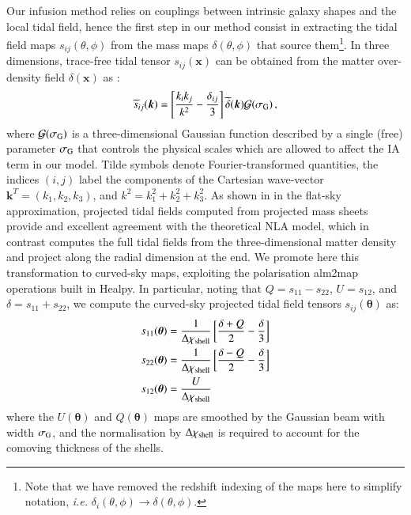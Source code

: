 Our infusion method relies on couplings between intrinsic galaxy shapes and the local tidal field, hence the first step in our method consist in extracting the tidal field maps $s_{ij}(\theta,\phi)$ from the mass maps $\delta(\theta,\phi)$ that source them\footnote{Note that we have removed the redshift indexing of the maps here to simplify notation, {\it i.e.} $\delta_i(\theta,\phi) \rightarrow \delta(\theta,\phi)$.}.
In three dimensions, trace-free tidal tensor $s_{ij}(\boldsymbol x)$ can be obtained from the matter over-density field $\delta(\boldsymbol x)$ as   \citep{Catelan_IA_Tidal}:
\begin{eqnarray}
 \widetilde{s}_{ij} (\boldsymbol k)  = \left[\frac{k_i k_j}{k^2} - \frac{\delta_{ij}}{3}\right]  \widetilde {\delta}(\boldsymbol k) \mathcal{G}(\sigma_{\rm G}) \, ,
 \label{eq:sij}
\end{eqnarray}
where $\mathcal{G}(\sigma_{\rm G})$ is a three-dimensional Gaussian function described by a single (free) parameter $\sigma_{\rm G}$ that  controls the physical scales which are allowed to affect the IA term in our model. 
Tilde symbols denote Fourier-transformed quantities, the indices $(i,j)$ label the components of the Cartesian wave-vector $\boldsymbol{k}^T = (k_1,k_2,k_3)$, and $k^2 = k_1^2 + k_2^2 + k_3^2$. 
As shown in \citet{Tidalator} in the flat-sky approximation, projected tidal fields  computed from projected mass sheets provide and excellent agreement with the  theoretical NLA model, which in contrast computes the full tidal fields from the three-dimensional matter density and project along the radial dimension at the end.
We promote here this transformation to curved-sky maps, exploiting the  polarisation {\sc alm2map} operations built in {\sc Healpy}. 
In particular, noting that $Q=s_{11}-s_{22}$, $U=s_{12}$, and $\delta=s_{11}+s_{22}$, we compute the curved-sky projected  tidal field tensors ${s}_{ij}({\boldsymbol \theta})$ as:
\begin{equation}\label{eq:sij_2D_sph}
\begin{split}
    s_{11}({\boldsymbol \theta})  &=  \frac{1}{\Delta \chi_{\rm shell}}\left[\frac{ \delta + Q}{2}  - \frac{\delta}{3}\right] \\ s_{22}({\boldsymbol \theta})  &=   \frac{1}{\Delta \chi_{\rm shell}}\left[\frac{\delta - Q}{2}  - \frac{\delta}{3}\right] \\ s_{12}({\boldsymbol \theta}) &=  \frac{U}{\Delta \chi_{\rm shell}} 
\end{split}
\end{equation}
where the $U({\boldsymbol \theta})$ and $Q({\boldsymbol \theta})$ maps are smoothed by the Gaussian beam with width $\sigma_{\rm G}$, and the normalisation by  $\Delta \chi_{\rm shell}$ is required to account for the comoving thickness of the shells.
